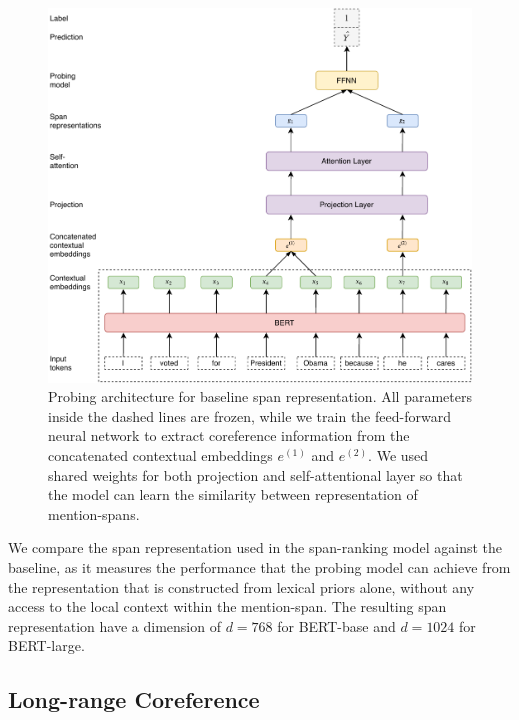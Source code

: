 \documentclass[11pt]{article}
\begin{document}
\begin{figure}[ht]
  \includegraphics[width=\textwidth]{baseline_span}
  \caption{Probing architecture for baseline span representation. All parameters inside the dashed lines are frozen, while we train the feed-forward neural network to extract coreference information from the concatenated contextual embeddings $e^{(1)}$ and $e^{(2)}$. We used shared weights for both projection and self-attentional layer so that the model can learn the similarity between representation of mention-spans.}
  \label{fig:baseline} 
\end{figure}

We compare the span representation used in the span-ranking model against the baseline, as it measures the performance that the probing model can achieve from the representation that is constructed from lexical priors alone, without any access to the local context within the mention-span. The resulting span representation have a dimension of $d = 768$ for BERT-base and $d = 1024$ for BERT-large.

\subsection{Long-range Coreference}
\end{document}
